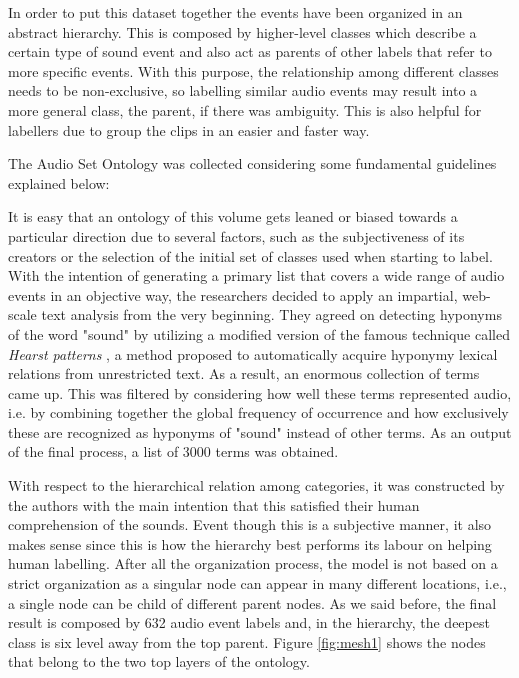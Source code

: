 	In order to put this dataset together the events have been organized in an abstract hierarchy. This is composed by higher-level classes which describe a certain type of sound event and also act as parents of other labels that refer to more specific events. With this purpose, the relationship among different classes needs to be non-exclusive, so labelling similar audio events may result into a more general class, the parent, if there was ambiguity. This is also helpful for labellers due to group the clips in an easier and faster way.
	
	The Audio Set Ontology was collected considering some fundamental guidelines explained below:
	
	
	It is easy that an ontology of this volume gets leaned or biased towards a particular direction due to several factors, such as the subjectiveness of its creators or the selection of the initial set of classes used when starting to label. With the intention of generating a primary list that covers a wide range of audio events in an objective way, the researchers decided to apply an impartial, web-scale text analysis from the very beginning. They agreed on detecting hyponyms of the word "sound" by utilizing a modified version of the famous technique called \textit{Hearst patterns} \cite{Hearst1992}, a method proposed to automatically acquire hyponymy lexical relations from unrestricted text. As a result, an enormous collection of terms came up. This was filtered by considering how well these terms represented audio, i.e. by combining together the global frequency of occurrence and how exclusively these are recognized as hyponyms of "sound" instead of other terms. As an output of the final process, a list of 3000 terms was obtained.
	
	With respect to the hierarchical relation among categories, it was constructed by the authors with the main intention that this satisfied their human comprehension of the sounds. Event though this is a subjective manner, it also makes sense since this is how the hierarchy best performs its labour on helping human labelling.
	After all the organization process, the model is not based on a strict organization as a singular node can appear in many different locations, i.e., a single node can be child of different parent nodes. As we said before, the final result is composed by 632 audio event labels and, in the hierarchy, the deepest class is six level away from the top parent. Figure \ref{fig:mesh1} shows the nodes that belong to the two top layers of the ontology.
	
